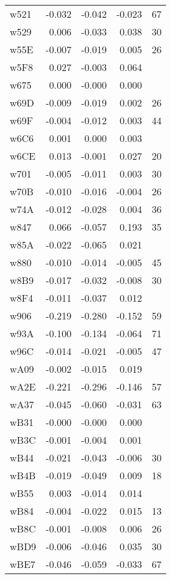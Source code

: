 \begin{table}[ht]
\begin{tabular}{lrrrr}
  w521 & -0.032 & -0.042 & -0.023 &   67 \\ 
  w529 & 0.006 & -0.033 & 0.038 &   30 \\ 
  w55E & -0.007 & -0.019 & 0.005 &   26 \\ 
  w5F8 & 0.027 & -0.003 & 0.064 &  \\ 
  w675 & 0.000 & -0.000 & 0.000 &  \\ 
  w69D & -0.009 & -0.019 & 0.002 &   26 \\ 
  w69F & -0.004 & -0.012 & 0.003 &   44 \\ 
  w6C6 & 0.001 & 0.000 & 0.003 &  \\ 
  w6CE & 0.013 & -0.001 & 0.027 &   20 \\ 
  w701 & -0.005 & -0.011 & 0.003 &   30 \\ 
  w70B & -0.010 & -0.016 & -0.004 &   26 \\ 
  w74A & -0.012 & -0.028 & 0.004 &   36 \\ 
  w847 & 0.066 & -0.057 & 0.193 &   35 \\ 
  w85A & -0.022 & -0.065 & 0.021 &  \\ 
  w880 & -0.010 & -0.014 & -0.005 &   45 \\ 
  w8B9 & -0.017 & -0.032 & -0.008 &   30 \\ 
  w8F4 & -0.011 & -0.037 & 0.012 &  \\ 
  w906 & -0.219 & -0.280 & -0.152 &   59 \\ 
  w93A & -0.100 & -0.134 & -0.064 &   71 \\ 
  w96C & -0.014 & -0.021 & -0.005 &   47 \\ 
  wA09 & -0.002 & -0.015 & 0.019 &  \\ 
  wA2E & -0.221 & -0.296 & -0.146 &   57 \\ 
  wA37 & -0.045 & -0.060 & -0.031 &   63 \\ 
  wB31 & -0.000 & -0.000 & 0.000 &  \\ 
  wB3C & -0.001 & -0.004 & 0.001 &  \\ 
  wB44 & -0.021 & -0.043 & -0.006 &   30 \\ 
  wB4B & -0.019 & -0.049 & 0.009 &   18 \\ 
  wB55 & 0.003 & -0.014 & 0.014 &  \\ 
  wB84 & -0.004 & -0.022 & 0.015 &   13 \\ 
  wB8C & -0.001 & -0.008 & 0.006 &   26 \\ 
  wBD9 & -0.006 & -0.046 & 0.035 &   30 \\ 
  wBE7 & -0.046 & -0.059 & -0.033 &   67 \\ 

\end{tabular}
\end{table}
